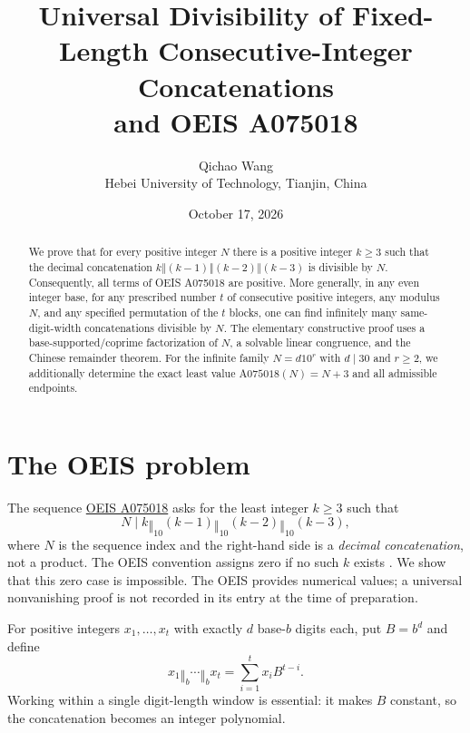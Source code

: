 \documentclass[10pt]{article}
\title{Universal Divisibility of Fixed-Length Consecutive-Integer Concatenations\\and OEIS A075018}
\author{Qichao Wang\\\small Hebei University of Technology, Tianjin, China}
\date{October 17, 2026}
\newcommand{\cat}{\mathbin{\Vert}}
\begin{document}
\maketitle
\begin{abstract}
We prove that for every positive integer $N$ there is a positive integer
$k\ge3$ such that the decimal concatenation
$k\cat(k-1)\cat(k-2)\cat(k-3)$ is divisible by $N$.
Consequently, all terms of OEIS A075018 are positive.
More generally, in any even integer base, for any prescribed number $t$
of consecutive positive integers, any modulus $N$, and any specified
permutation of the $t$ blocks, one can find infinitely many
same-digit-width concatenations divisible by $N$.
The elementary constructive proof uses a base-supported/coprime
factorization of $N$, a solvable linear congruence, and the Chinese
remainder theorem. For the infinite family $N=d10^r$ with $d\mid30$
and $r\ge2$, we additionally determine the exact least value
$\mathrm{A075018}(N)=N+3$ and all admissible endpoints.
\end{abstract}

\section{The OEIS problem}
The sequence \href{https://oeis.org/A075018}{OEIS A075018}
asks for the least integer $k\ge3$ such that
\begin{equation}\label{eq:target}
 N\mid k\cat_{10}(k-1)\cat_{10}(k-2)\cat_{10}(k-3),
\end{equation}
where $N$ is the sequence index and the right-hand side is a
\emph{decimal concatenation}, not a product. The OEIS convention
assigns zero if no such $k$ exists \cite{oeis}. We show that this
zero case is impossible. The OEIS provides numerical values; a
universal nonvanishing proof is not recorded in its entry at the
time of preparation.

For positive integers $x_1,\ldots,x_t$ with exactly $d$ base-$b$
digits each, put $B=b^d$ and define
\begin{equation}\label{eq:polynomial}
 x_1\cat_b\cdots\cat_b x_t
 =\sum_{i=1}^{t}x_i B^{t-i}.
\end{equation}
Working within a single digit-length window is essential: it makes
$B$ constant, so the concatenation becomes an integer polynomial.
\end{document}
